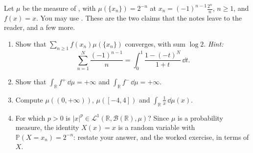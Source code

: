 \begin{exercise}\label{ex:ig-discrete}
\easy Let $\mu$ be the measure of , with
$\mu(\{x_n\})=2^{-n}$ at $x_n=(-1)^{n-1}\frac{2^n}n$, $n\ge1$, and $f(x)=x$. You may use
. These are the two claims that the notes leave to the reader,
and a few more.
\begin{enumerate}[label=(\alph*)]
  \item Show that $\sum_{n\ge1}f(x_n)\mu(\{x_n\})$ converges, with sum $\log2$. \emph{Hint:}
    \[
      \sum_{n=1}^N\frac{(-1)^{n-1}}n=\int_0^1\frac{1-(-t)^N}{1+t}\,\dd t .
    \]
  \item Show that $\int_{\mathbb R}f^+\,\dd\mu=+\infty$ and $\int_{\mathbb R}f^-\,\dd\mu=+\infty$.
  \item Compute $\mu((0,+\infty))$, $\mu([-4,4])$ and $\int_{\mathbb R}\frac1x\,\dd\mu(x)$.
  \item For which $p>0$ is $|x|^p\in\mathcal L^1(\mathbb R,\mathcal B(\mathbb R),\mu)$? Since $\mu$
    is a probability measure, the identity $X(x)=x$ is a random variable with
    $\mathbb P(X=x_n)=2^{-n}$: restate your answer, and the worked exercise, in terms of $X$.
\end{enumerate}
\end{exercise}

